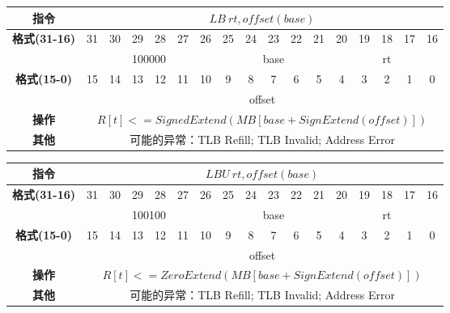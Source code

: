 \documentclass[11pt,utf8]{article}
\begin{document}
\begin{center}
\begin{tabular}{|c|c|c|c|c|c|c|c|c|c|c|c|c|c|c|c|c|}
\hline
\textbf{指令} & \multicolumn{16}{c|}{$LB~rt,offset(base)$} \\
\hline
\multirow{2}{*}{\textbf{格式(31-16)}} & 31 & 30 & 29 & 28 & 27 & 26 & 25 & 24 & 23 & 22 & 21 & 20 & 19 & 18 & 17 & 16 \\ 
\cline{2-17}
& \multicolumn{6}{c|}{100000} & \multicolumn{5}{c|}{base} & \multicolumn{5}{c|}{rt}\\
\hline
\multirow{2}{*}{\textbf{格式(15-0)}} & 15 & 14 & 13 & 12 & 11 & 10 & 9 & 8 & 7 & 6 & 5 & 4 & 3 & 2 & 1 & 0 \\
\cline{2-17}
& \multicolumn{16}{c|}{offset}\\
\hline
\textbf{操作} & \multicolumn{16}{c|}{$R[t]<=SignedExtend(MB[base+SignExtend(offset)])$} \\
\hline
\textbf{其他} & \multicolumn{16}{c|}{可能的异常：TLB Refill; TLB Invalid; Address Error} \\
\hline
\end{tabular}
\end{center}

\begin{center}
\begin{tabular}{|c|c|c|c|c|c|c|c|c|c|c|c|c|c|c|c|c|}
\hline
\textbf{指令} & \multicolumn{16}{c|}{$LBU~rt,offset(base)$} \\
\hline
\multirow{2}{*}{\textbf{格式(31-16)}} & 31 & 30 & 29 & 28 & 27 & 26 & 25 & 24 & 23 & 22 & 21 & 20 & 19 & 18 & 17 & 16 \\ 
\cline{2-17}
& \multicolumn{6}{c|}{100100} & \multicolumn{5}{c|}{base} & \multicolumn{5}{c|}{rt}\\
\hline
\multirow{2}{*}{\textbf{格式(15-0)}} & 15 & 14 & 13 & 12 & 11 & 10 & 9 & 8 & 7 & 6 & 5 & 4 & 3 & 2 & 1 & 0 \\
\cline{2-17}
& \multicolumn{16}{c|}{offset}\\
\hline
\textbf{操作} & \multicolumn{16}{c|}{$R[t]<=ZeroExtend(MB[base+SignExtend(offset)])$} \\
\hline
\textbf{其他} & \multicolumn{16}{c|}{可能的异常：TLB Refill; TLB Invalid; Address Error} \\
\hline
\end{tabular}
\end{center}
\end{document}
